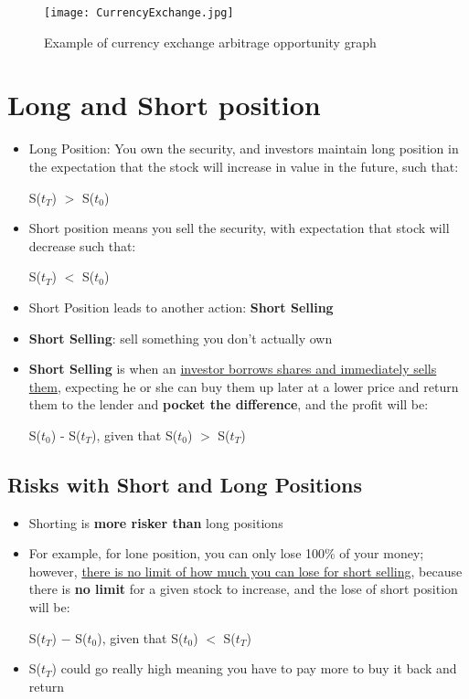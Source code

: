 \documentclass{article}
\begin{document}
\begin{figure}
\centering
\texttt{[image: CurrencyExchange.jpg]}
\caption{Example of currency exchange arbitrage opportunity graph}
\end{figure}

\section{Long and Short position}
\begin{itemize}
\item Long Position: You own the security, and investors maintain long position in the expectation that the stock will increase in value in the future, such that:

\begin{center} S($t_T$) $>$ S($t_0$) \end{center}

\item Short position means you sell the security, with expectation that stock will decrease such that:

\begin{center} S($t_T$) $<$ S($t_0$) \end{center}

\item Short Position leads to another action: \textbf{Short Selling}
\item \textbf{Short Selling}: sell something you don't actually own
\item \textbf{Short Selling} is when an \underline{investor borrows shares and immediately sells them}, expecting he or she can buy them up later at a lower price and return them to the lender and \textbf{pocket the difference}, and the profit will be: 

\begin{center}  S($t_0$) - S($t_T$), given that S($t_0$) $>$ S($t_T$) \end{center}
\end{itemize}

\subsection{Risks with Short and Long Positions}
\begin{itemize}
\item Shorting is \textbf{more risker than} long positions
\item For example, for lone position, you can only lose 100\% of your money; however, \underline{there is no limit of how much you can lose for short selling}, because there is \textbf{no limit} for a given stock to increase, and the lose of short position will be: 

\begin{center}  S($t_T$) $-$ S($t_0$), given that S($t_0$) $<$ S($t_T$)  \end{center}
\item S($t_T$) could go really high meaning you have to pay more to buy it back and return

\end{itemize}
\end{document}
